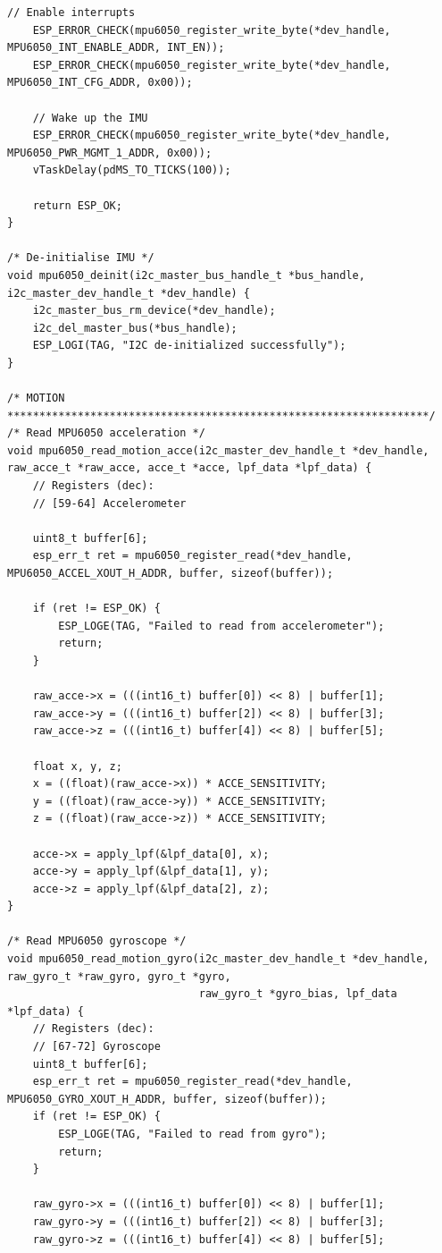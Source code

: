 \begin{lstlisting}[caption={Register Read}]
    // Enable interrupts
    ESP_ERROR_CHECK(mpu6050_register_write_byte(*dev_handle, MPU6050_INT_ENABLE_ADDR, INT_EN));
    ESP_ERROR_CHECK(mpu6050_register_write_byte(*dev_handle, MPU6050_INT_CFG_ADDR, 0x00));

    // Wake up the IMU
    ESP_ERROR_CHECK(mpu6050_register_write_byte(*dev_handle, MPU6050_PWR_MGMT_1_ADDR, 0x00));
    vTaskDelay(pdMS_TO_TICKS(100)); 

    return ESP_OK;
}

/* De-initialise IMU */
void mpu6050_deinit(i2c_master_bus_handle_t *bus_handle, i2c_master_dev_handle_t *dev_handle) {
    i2c_master_bus_rm_device(*dev_handle);
    i2c_del_master_bus(*bus_handle);
    ESP_LOGI(TAG, "I2C de-initialized successfully");
}

/* MOTION ******************************************************************/
/* Read MPU6050 acceleration */
void mpu6050_read_motion_acce(i2c_master_dev_handle_t *dev_handle, raw_acce_t *raw_acce, acce_t *acce, lpf_data *lpf_data) {
    // Registers (dec):
    // [59-64] Accelerometer

    uint8_t buffer[6];
    esp_err_t ret = mpu6050_register_read(*dev_handle, MPU6050_ACCEL_XOUT_H_ADDR, buffer, sizeof(buffer));

    if (ret != ESP_OK) {
        ESP_LOGE(TAG, "Failed to read from accelerometer");
        return;
    }
    
    raw_acce->x = (((int16_t) buffer[0]) << 8) | buffer[1];
    raw_acce->y = (((int16_t) buffer[2]) << 8) | buffer[3];
    raw_acce->z = (((int16_t) buffer[4]) << 8) | buffer[5];
    
    float x, y, z; 
    x = ((float)(raw_acce->x)) * ACCE_SENSITIVITY;
    y = ((float)(raw_acce->y)) * ACCE_SENSITIVITY;
    z = ((float)(raw_acce->z)) * ACCE_SENSITIVITY;

    acce->x = apply_lpf(&lpf_data[0], x);
    acce->y = apply_lpf(&lpf_data[1], y);
    acce->z = apply_lpf(&lpf_data[2], z);
}

/* Read MPU6050 gyroscope */
void mpu6050_read_motion_gyro(i2c_master_dev_handle_t *dev_handle, raw_gyro_t *raw_gyro, gyro_t *gyro,
                              raw_gyro_t *gyro_bias, lpf_data *lpf_data) {
    // Registers (dec):
    // [67-72] Gyroscope
    uint8_t buffer[6];
    esp_err_t ret = mpu6050_register_read(*dev_handle, MPU6050_GYRO_XOUT_H_ADDR, buffer, sizeof(buffer));
    if (ret != ESP_OK) {
        ESP_LOGE(TAG, "Failed to read from gyro");
        return;
    }

    raw_gyro->x = (((int16_t) buffer[0]) << 8) | buffer[1];
    raw_gyro->y = (((int16_t) buffer[2]) << 8) | buffer[3];
    raw_gyro->z = (((int16_t) buffer[4]) << 8) | buffer[5];
    

\end{lstlisting}
